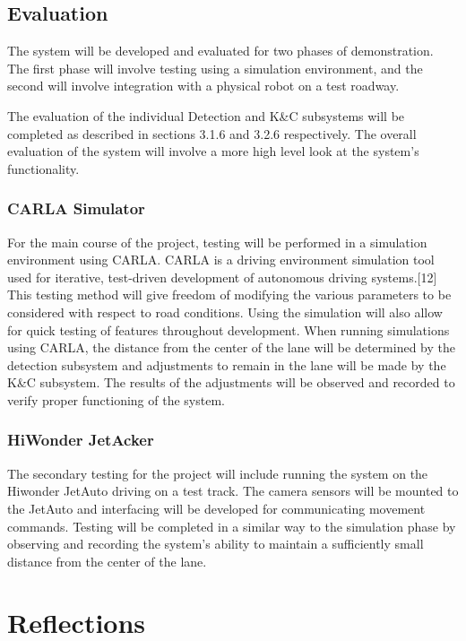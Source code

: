\documentclass[titlepage]{article}
\begin{document}
\subsection{Evaluation}
The system will be developed and evaluated for two phases of demonstration. The first phase will involve testing using a simulation environment, and the second will involve integration with a physical robot on a test roadway.

The evaluation of the individual Detection and K\&C subsystems will be completed as described in sections 3.1.6 and 3.2.6 respectively. The overall evaluation of the system will involve a more high level look at the system’s functionality.

\subsubsection{CARLA Simulator}
For the main course of the project, testing will be performed in a simulation environment using CARLA. CARLA is a driving environment simulation tool used for iterative, test-driven development of autonomous driving systems.[12] This testing method will give freedom of modifying the various parameters to be considered with respect to road conditions. Using the simulation will also allow for quick testing of features throughout development. When running simulations using CARLA, the distance from the center of the lane will be determined by the detection subsystem and adjustments to remain in the lane will be made by the K\&C subsystem. The results of the adjustments will be observed and recorded to verify proper functioning of the system.

\subsubsection{HiWonder JetAcker}

The secondary testing for the project will include running the system on the Hiwonder JetAuto driving on a test track. The camera sensors will be mounted to the JetAuto and interfacing will be developed for communicating movement commands. Testing will be completed in a similar way to the simulation phase by observing and recording the system’s ability to maintain a sufficiently small distance from the center of the lane.


\section{Reflections}
\end{document}
